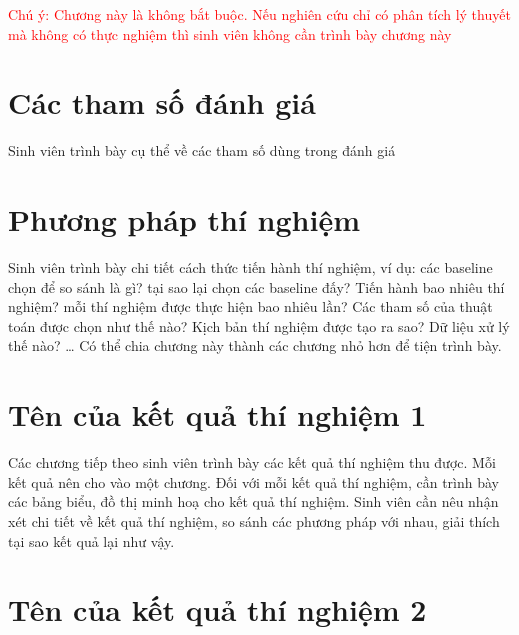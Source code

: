\documentclass[../main.tex]{subfiles}
\begin{document}
\textcolor{red}{Chú ý: Chương này là không bắt buộc. Nếu nghiên cứu chỉ có phân tích lý thuyết mà không có thực nghiệm thì sinh viên không cần trình bày chương này }

\section{Các tham số đánh giá}

Sinh viên trình bày cụ thể về các tham số dùng trong đánh giá 

\section{Phương pháp thí nghiệm}

Sinh viên trình bày chi tiết cách thức tiến hành thí nghiệm, ví dụ: các baseline chọn để so sánh là gì? tại sao lại chọn các baseline đấy? Tiến hành bao nhiêu thí nghiệm? mỗi thí nghiệm được thực hiện bao nhiêu lần? Các tham số của thuật toán được chọn như thế nào? Kịch bản thí nghiệm được tạo ra sao? Dữ liệu xử lý thế nào? … Có thể chia  chương này thành các chương nhỏ hơn để tiện trình bày. 

\section{Tên của kết quả thí nghiệm 1}

Các chương tiếp theo sinh viên trình bày các kết quả thí nghiệm thu được. Mỗi kết quả nên cho vào một chương. Đối với mỗi kết quả thí nghiệm, cần trình bày các bảng biểu, đồ thị minh hoạ cho kết quả thí nghiệm. Sinh viên cần nêu nhận xét chi tiết về kết quả thí nghiệm, so sánh các phương pháp với nhau, giải thích tại sao kết quả lại như vậy. 

\section{Tên của kết quả thí nghiệm 2}
\end{document}
